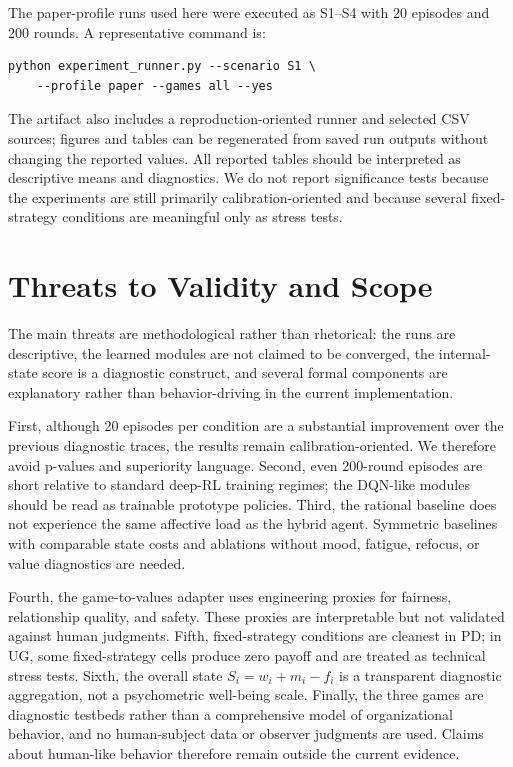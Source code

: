 \documentclass[runningheads]{llncs}
\begin{document}
The paper-profile runs used here were executed as S1--S4 with 20 episodes and 200 rounds. A representative command is:
\begin{verbatim}
python experiment_runner.py --scenario S1 \
    --profile paper --games all --yes
\end{verbatim}
The artifact also includes a reproduction-oriented runner and selected CSV sources; figures and tables can be regenerated from saved run outputs without changing the reported values. All reported tables should be interpreted as descriptive means and diagnostics. We do not report significance tests because the experiments are still primarily calibration-oriented and because several fixed-strategy conditions are meaningful only as stress tests.

\section{Threats to Validity and Scope}

The main threats are methodological rather than rhetorical: the runs are descriptive, the learned modules are not claimed to be converged, the internal-state score is a diagnostic construct, and several formal components are explanatory rather than behavior-driving in the current implementation.

First, although 20 episodes per condition are a substantial improvement over the previous diagnostic traces, the results remain calibration-oriented. We therefore avoid p-values and superiority language. Second, even 200-round episodes are short relative to standard deep-RL training regimes; the DQN-like modules should be read as trainable prototype policies. Third, the rational baseline does not experience the same affective load as the hybrid agent. Symmetric baselines with comparable state costs and ablations without mood, fatigue, refocus, or value diagnostics are needed.

Fourth, the game-to-values adapter uses engineering proxies for fairness, relationship quality, and safety. These proxies are interpretable but not validated against human judgments. Fifth, fixed-strategy conditions are cleanest in PD; in UG, some fixed-strategy cells produce zero payoff and are treated as technical stress tests. Sixth, the overall state $S_i=w_i+m_i-f_i$ is a transparent diagnostic aggregation, not a psychometric well-being scale. Finally, the three games are diagnostic testbeds rather than a comprehensive model of organizational behavior, and no human-subject data or observer judgments are used. Claims about human-like behavior therefore remain outside the current evidence.
\end{document}
